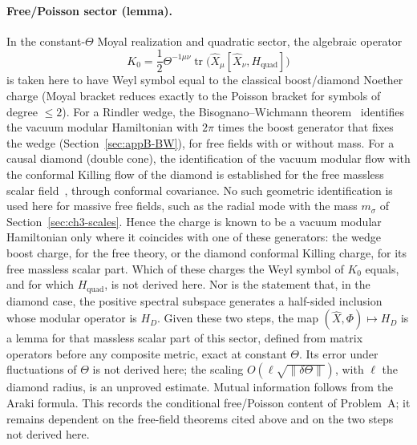 \paragraph{Free/Poisson sector (lemma).}
In the constant-\(\Theta\) Moyal realization and quadratic sector, the
algebraic operator
\[
K_0=\frac12\Theta^{-1\mu\nu}\operatorname{tr}\bigl(\hat X_\mu[\hat X_\nu,H_{\mathrm{quad}}]\bigr)
\]
is taken here to have Weyl symbol equal to the classical boost/diamond
Noether charge
(Moyal bracket reduces exactly to the Poisson bracket for symbols of
degree \(\le 2\)). For a Rindler wedge, the Bisognano--Wichmann
theorem~\cite{BisognanoWichmann1976} identifies the vacuum modular
Hamiltonian with \(2\pi\) times the boost generator that fixes the
wedge (Section~\ref{sec:appB-BW}), for free fields with or without
mass. For a causal diamond (double cone), the identification of the
vacuum modular flow with the conformal Killing flow of the diamond is
established for the free massless scalar field~\cite{HislopLongo1982},
through conformal covariance. No such geometric identification is
used here for massive free fields, such as the radial mode with the
mass \(m_\sigma\) of Section~\ref{sec:ch3-scales}. Hence the charge
is known to be a vacuum modular Hamiltonian only where it coincides
with one of
these generators: the wedge boost charge, for the free theory, or the
diamond conformal Killing charge, for its free massless scalar part.
Which of these charges the Weyl symbol of \(K_0\) equals, and for
which \(H_{\mathrm{quad}}\), is not derived here. Nor is the statement
that, in the diamond case, the positive spectral subspace generates a
half-sided inclusion whose modular operator is \(H_D\). Given these
two steps, the map \((\hat X,\Phi)\mapsto H_D\) is a lemma for that
massless scalar part of this sector, defined from
matrix operators before any composite metric, exact at constant
\(\Theta\). Its error under fluctuations of \(\Theta\) is not derived
here; the scaling \(O(\ell\sqrt{\|\delta\Theta\|})\), with \(\ell\) the
diamond radius, is an unproved estimate.
Mutual information follows from the Araki formula. This records the
conditional free/Poisson content of Problem~A; it remains dependent on
the free-field theorems cited above and on the two steps not derived
here.

